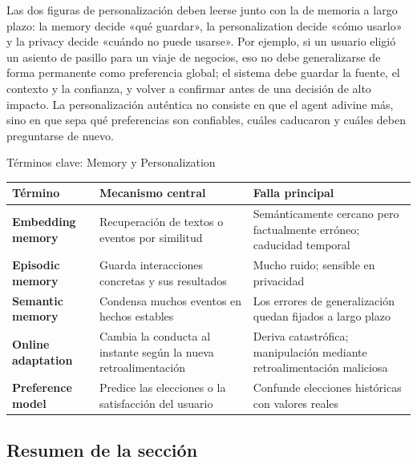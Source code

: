 \documentclass[a4paper]{article}
\begin{document}
Las dos figuras de personalización deben leerse junto con la de memoria a largo plazo: la memory decide «qué guardar», la personalization decide «cómo usarlo» y la privacy decide «cuándo no puede usarse». Por ejemplo, si un usuario eligió un asiento de pasillo para un viaje de negocios, eso no debe generalizarse de forma permanente como preferencia global; el sistema debe guardar la fuente, el contexto y la confianza, y volver a confirmar antes de una decisión de alto impacto. La personalización auténtica no consiste en que el agent adivine más, sino en que sepa qué preferencias son confiables, cuáles caducaron y cuáles deben preguntarse de nuevo.


\begin{knowledgebox}{Términos clave: Memory y Personalization}
\begin{tabularx}{\textwidth}{>{\bfseries}p{} X X}
Término & Mecanismo central & Falla principal \\
\hline
Embedding memory & Recuperación de textos o eventos por similitud & Semánticamente cercano pero factualmente erróneo; caducidad temporal \\
Episodic memory & Guarda interacciones concretas y sus resultados & Mucho ruido; sensible en privacidad \\
Semantic memory & Condensa muchos eventos en hechos estables & Los errores de generalización quedan fijados a largo plazo \\
Online adaptation & Cambia la conducta al instante según la nueva retroalimentación & Deriva catastrófica; manipulación mediante retroalimentación maliciosa \\
Preference model & Predice las elecciones o la satisfacción del usuario & Confunde elecciones históricas con valores reales \\
\end{tabularx}
\end{knowledgebox}

\subsection{Resumen de la sección}
\end{document}
